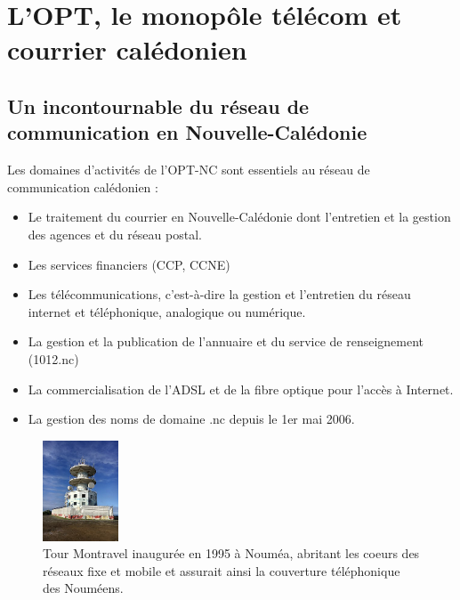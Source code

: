 \documentclass[12pt,a4paper]{report}
\begin{document}
\chapter{L'OPT, le monopôle télécom et courrier calédonien}
\section{Un incontournable du réseau de communication en Nouvelle-Calédonie}
Les domaines d'activités de l'OPT-NC sont essentiels au réseau de communication calédonien :

\vspace{0.5cm}

\begin{itemize}
    \item Le traitement du courrier en Nouvelle-Calédonie dont l'entretien et la gestion des agences et du réseau postal.
    \item Les services financiers (CCP, CCNE)
    \item Les télécommunications, c'est-à-dire la gestion et l'entretien du réseau internet et téléphonique, analogique ou numérique.
    \item La gestion et la publication de l'annuaire et du service de renseignement (1012.nc)
    \item La commercialisation de l'ADSL et de la fibre optique pour l'accès à Internet.
    \item La gestion des noms de domaine .nc depuis le 1er mai 2006.
\end{itemize}
\begin{figure}[h] %
    \centering
    \includegraphics[width=0.2\textwidth]{ressources_rapport/tour_montravel.jpg}
    \caption{Tour Montravel inaugurée en 1995 à Nouméa, abritant les coeurs des réseaux fixe et mobile et assurait ainsi la couverture téléphonique des Nouméens.}
\end{figure}
\newpage
\end{document}
